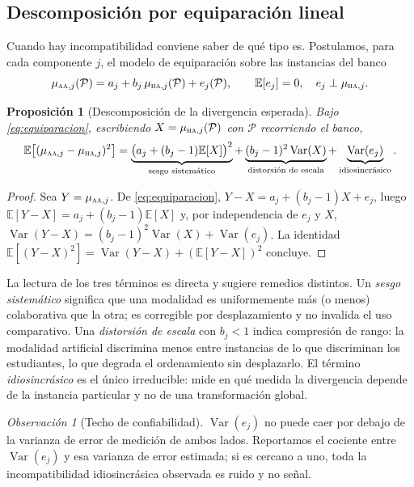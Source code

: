 \documentclass[11pt,a4paper]{article}
\theoremstyle{definition}
\theoremstyle{plain}
\newtheorem{proposicion}[definicion]{Proposición}
\theoremstyle{remark}
\newtheorem{observacion}[definicion]{Observación}
\DeclareMathOperator{\Var}{Var}
\newcommand{\Esp}{\mathbb{E}}
\newcommand{\modAA}{\textsc{aa}}
\newcommand{\modHA}{\textsc{ha}}
\begin{document}
\subsection{Descomposición por equiparación lineal}

Cuando hay incompatibilidad conviene saber de qué tipo es. Postulamos, para cada
componente $j$, el modelo de equiparación sobre las instancias del banco
\begin{equation}\label{eq:equiparacion}
  \mu_{\modAA,j}(\mathcal{P})=a_j+b_j\,\mu_{\modHA,j}(\mathcal{P})+e_j(\mathcal{P}),
  \qquad \Esp[e_j]=0,\quad e_j\perp\mu_{\modHA,j}.
\end{equation}

\begin{proposicion}[Descomposición de la divergencia esperada]\label{prop:descomp}
Bajo \eqref{eq:equiparacion}, escribiendo $X=\mu_{\modHA,j}(\mathcal{P})$ con
$\mathcal{P}$ recorriendo el banco,
\[
  \Esp\big[(\mu_{\modAA,j}-\mu_{\modHA,j})^{2}\big]
  =\underbrace{\big(a_j+(b_j-1)\Esp[X]\big)^{2}}_{\text{sesgo sistemático}}
  +\underbrace{(b_j-1)^{2}\Var(X)}_{\text{distorsión de escala}}
  +\underbrace{\Var(e_j)}_{\text{idiosincrásico}} .
\]
\end{proposicion}

\begin{proof}
Sea $Y=\mu_{\modAA,j}$. De \eqref{eq:equiparacion},
$Y-X=a_j+(b_j-1)X+e_j$, luego
$\Esp[Y-X]=a_j+(b_j-1)\Esp[X]$ y, por independencia de $e_j$ y $X$,
$\Var(Y-X)=(b_j-1)^{2}\Var(X)+\Var(e_j)$. La identidad
$\Esp[(Y-X)^2]=\Var(Y-X)+(\Esp[Y-X])^{2}$ concluye.
\end{proof}

La lectura de los tres términos es directa y sugiere remedios distintos. Un
\emph{sesgo sistemático} significa que una modalidad es uniformemente más (o
menos) colaborativa que la otra; es corregible por desplazamiento y no invalida el
uso comparativo. Una \emph{distorsión de escala} con $b_j<1$ indica compresión de
rango: la modalidad artificial discrimina menos entre instancias de lo que
discriminan los estudiantes, lo que degrada el ordenamiento sin desplazarlo. El
término \emph{idiosincrásico} es el único irreducible: mide en qué medida la
divergencia depende de la instancia particular y no de una transformación global.

\begin{observacion}[Techo de confiabilidad]
$\Var(e_j)$ no puede caer por debajo de la varianza de error de medición de ambos
lados. Reportamos el cociente entre $\Var(e_j)$ y esa varianza de error estimada;
si es cercano a uno, toda la incompatibilidad idiosincrásica observada es ruido y
no señal.
\end{observacion}
\end{document}

